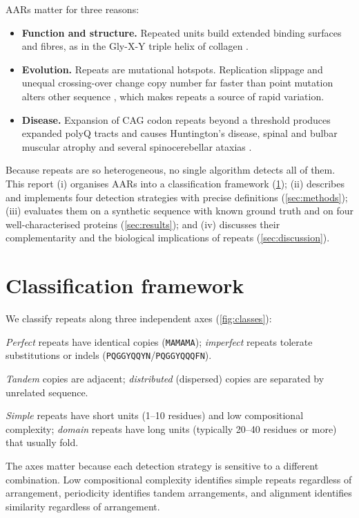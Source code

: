 \documentclass[11pt,a4paper]{article}
\newcommand{\seq}[1]{\texttt{#1}}
\begin{document}
AARs matter for three reasons:
\begin{itemize}
  \item \textbf{Function and structure.} Repeated units build extended binding surfaces and fibres,
        as in the Gly-X-Y triple helix of collagen \cite{shoulders2009collagen}.
  \item \textbf{Evolution.} Repeats are mutational hotspots. Replication slippage and unequal crossing-over
        change copy number far faster than point mutation alters other sequence
        \cite{levinson1987slipped}, which makes repeats a source of rapid variation.
  \item \textbf{Disease.} Expansion of CAG codon repeats beyond a threshold produces expanded polyQ tracts and
        causes Huntington's disease, spinal and bulbar muscular atrophy and several spinocerebellar ataxias
        \cite{orr2007trinucleotide,hdcrg1993,laspada1991sbma}.
\end{itemize}

Because repeats are so heterogeneous, no single algorithm detects all of them. This report
(i) organises AARs into a classification framework (\cref{sec:classification}); (ii) describes and implements
four detection strategies with precise definitions (\cref{sec:methods}); (iii) evaluates them on a
synthetic sequence with known ground truth and on four well-characterised proteins (\cref{sec:results}); and
(iv) discusses their complementarity and the biological implications of repeats (\cref{sec:discussion}).

\section{Classification framework}\label{sec:classification}

We classify repeats along three independent axes (\cref{fig:classes}):
\begin{description}[leftmargin=1.2em,font=\sffamily\bfseries]
  \item[Unit similarity] \emph{Perfect} repeats have identical copies (\seq{MAMAMA}); \emph{imperfect}
        repeats tolerate substitutions or indels (\seq{PQGGYQQYN}/\seq{PQGGYQQQFN}).
  \item[Spatial arrangement] \emph{Tandem} copies are adjacent; \emph{distributed} (dispersed) copies are separated by
        unrelated sequence.
  \item[Pattern complexity] \emph{Simple} repeats have short units (1--10 residues) and low compositional
        complexity; \emph{domain} repeats have long units (typically 20--40 residues or more) that usually fold.
\end{description}
The axes matter because each detection strategy is sensitive to a different combination.
Low compositional complexity identifies simple repeats regardless of arrangement, periodicity
identifies tandem arrangements, and alignment identifies similarity regardless of arrangement.
\end{document}
